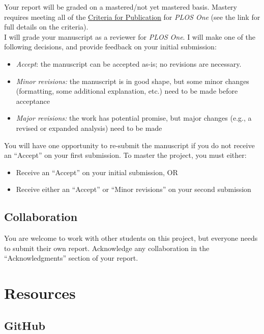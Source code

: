 \documentclass[11pt]{article}
\begin{document}
Your report will be graded on a mastered/not yet mastered basis. Mastery requires meeting all of the \href{https://journals.plos.org/plosone/s/journal-information#loc-criteria-for-publication}{\underline{Criteria for Publication}} for \textit{PLOS One} (see the link for full details on the criteria).\\

\noindent I will grade your manuscript as a reviewer for \textit{PLOS One}. I will make one of the following decisions, and provide feedback on your initial submission:
\begin{itemize}
\item \textit{Accept}: the manuscript can be accepted as-is; no revisions are necessary.

\item \textit{Minor revisions:} the manuscript is in good shape, but some minor changes (formatting, some additional explanation, etc.) need to be made before acceptance

\item \textit{Major revisions:} the work has potential promise, but major changes (e.g., a revised or expanded analysis) need to be made
\end{itemize}

\noindent You will have one opportunity to re-submit the manuscript if you do not receive an ``Accept'' on your first submission. To master the project, you must either:
\begin{itemize}
\item Receive an ``Accept'' on your initial submission, OR
\item Receive either an ``Accept'' or ``Minor revisions'' on your second submission
\end{itemize}

\subsection*{Collaboration}

You are welcome to work with other students on this project, but everyone needs to submit their own report. Acknowledge any collaboration in the ``Acknowledgments'' section of your report.

\section*{Resources}

\subsection*{GitHub}
\end{document}
